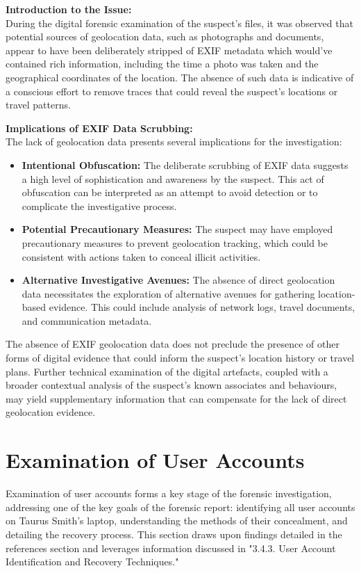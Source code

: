 \textbf{Introduction to the Issue:}\\
During the digital forensic examination of the suspect's files, it was observed that potential sources of geolocation data, such as photographs and documents, appear to have been deliberately stripped of EXIF metadata which would've contained rich information, including the time a photo was taken and the geographical coordinates of the location. The absence of such data is indicative of a conscious effort to remove traces that could reveal the suspect's locations or travel patterns.

\textbf{Implications of EXIF Data Scrubbing:}\\
The lack of geolocation data presents several implications for the investigation:
\begin{itemize}
    \item \textbf{Intentional Obfuscation:} The deliberate scrubbing of EXIF data suggests a high level of sophistication and awareness by the suspect. This act of obfuscation can be interpreted as an attempt to avoid detection or to complicate the investigative process.
    \item \textbf{Potential Precautionary Measures:} The suspect may have employed precautionary measures to prevent geolocation tracking, which could be consistent with actions taken to conceal illicit activities.
    \item \textbf{Alternative Investigative Avenues:} The absence of direct geolocation data necessitates the exploration of alternative avenues for gathering location-based evidence. This could include analysis of network logs, travel documents, and communication metadata.
\end{itemize}

The absence of EXIF geolocation data does not preclude the presence of other forms of digital evidence that could inform the suspect's location history or travel plans. Further technical examination of the digital artefacts, coupled with a broader contextual analysis of the suspect's known associates and behaviours, may yield supplementary information that can compensate for the lack of direct geolocation evidence.

\section{Examination of User Accounts}
Examination of user accounts forms a key stage of the forensic investigation, addressing one of the key goals of the forensic report: identifying all user accounts on Taurus Smith's laptop, understanding the methods of their concealment, and detailing the recovery process. This section draws upon findings detailed in the references section and leverages information discussed in "3.4.3. User Account Identification and Recovery Techniques."

